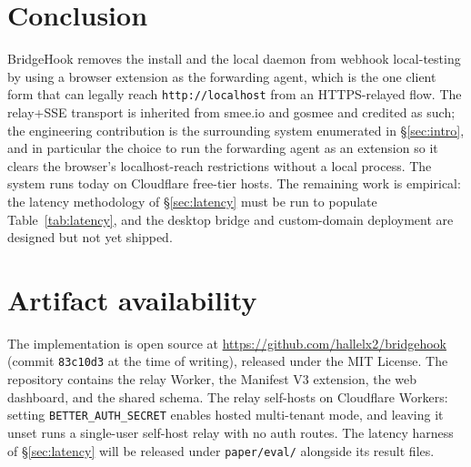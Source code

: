 \documentclass[11pt]{article}
\begin{document}
\section{Conclusion}
\label{sec:conclusion}

BridgeHook removes the install and the local daemon from webhook local-testing
by using a browser extension as the forwarding agent, which is the one client
form that can legally reach \texttt{http://localhost} from an HTTPS-relayed
flow. The relay+SSE transport is inherited from smee.io and gosmee and credited
as such; the engineering contribution is the surrounding system enumerated in
\S\ref{sec:intro}, and in particular the choice to run the forwarding agent as
an extension so it clears the browser's localhost-reach restrictions without a
local process. The system runs today on Cloudflare free-tier hosts. The
remaining work is empirical: the latency methodology of \S\ref{sec:latency} must
be run to populate Table~\ref{tab:latency}, and the desktop bridge and
custom-domain deployment are designed but not yet shipped.

\section*{Artifact availability}
The implementation is open source at
\url{https://github.com/hallelx2/bridgehook} (commit \texttt{83c10d3} at the
time of writing), released under the MIT License. The repository contains the
relay Worker, the Manifest V3 extension, the web dashboard, and the shared
schema. The relay self-hosts on Cloudflare Workers: setting
\texttt{BETTER\_AUTH\_SECRET} enables hosted multi-tenant mode, and leaving it
unset runs a single-user self-host relay with no auth routes. The latency
harness of \S\ref{sec:latency} will be released under \texttt{paper/eval/}
alongside its result files.



\end{document}
